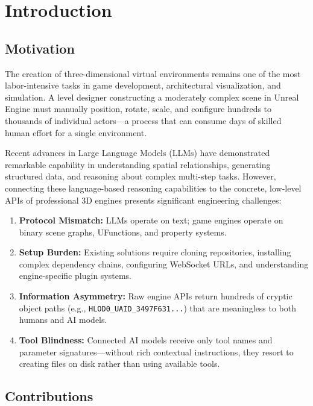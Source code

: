\documentclass[conference]{IEEEtran}
\begin{document}
\section{Introduction}

\subsection{Motivation}

The creation of three-dimensional virtual environments remains one of the most labor-intensive tasks in game development, architectural visualization, and simulation. A level designer constructing a moderately complex scene in Unreal Engine must manually position, rotate, scale, and configure hundreds to thousands of individual actors---a process that can consume days of skilled human effort for a single environment.

Recent advances in Large Language Models (LLMs) have demonstrated remarkable capability in understanding spatial relationships, generating structured data, and reasoning about complex multi-step tasks. However, connecting these language-based reasoning capabilities to the concrete, low-level APIs of professional 3D engines presents significant engineering challenges:

\begin{enumerate}[leftmargin=*]
    \item \textbf{Protocol Mismatch:} LLMs operate on text; game engines operate on binary scene graphs, UFunctions, and property systems.
    \item \textbf{Setup Burden:} Existing solutions require cloning repositories, installing complex dependency chains, configuring WebSocket URLs, and understanding engine-specific plugin systems.
    \item \textbf{Information Asymmetry:} Raw engine APIs return hundreds of cryptic object paths (e.g., \texttt{HLOD0\_UAID\_3497F631...}) that are meaningless to both humans and AI models.
    \item \textbf{Tool Blindness:} Connected AI models receive only tool names and parameter signatures---without rich contextual instructions, they resort to creating files on disk rather than using available tools.
\end{enumerate}

\subsection{Contributions}
\end{document}
